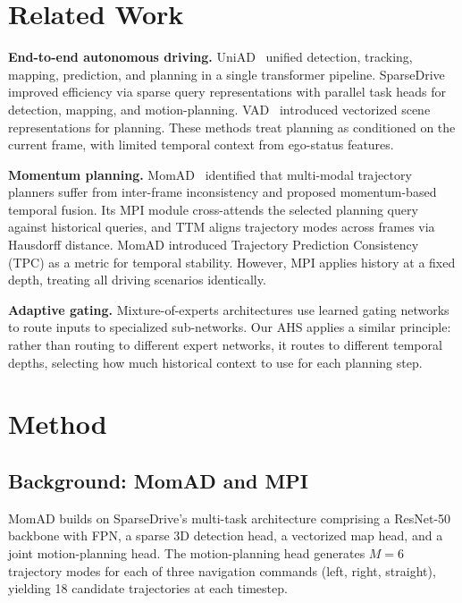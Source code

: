 \documentclass{article}
\begin{document}
\section{Related Work}
\label{sec:related}

\textbf{End-to-end autonomous driving.}
UniAD~\cite{hu2023uniad} unified detection, tracking, mapping, prediction, and planning in a single transformer pipeline.
SparseDrive~\cite{sun2024sparsedrive} improved efficiency via sparse query representations with parallel task heads for detection, mapping, and motion-planning.
VAD~\cite{jiang2023vad} introduced vectorized scene representations for planning.
These methods treat planning as conditioned on the current frame, with limited temporal context from ego-status features.

\textbf{Momentum planning.}
MomAD~\cite{li2025momad} identified that multi-modal trajectory planners suffer from inter-frame inconsistency and proposed momentum-based temporal fusion.
Its MPI module cross-attends the selected planning query against historical queries, and TTM aligns trajectory modes across frames via Hausdorff distance.
MomAD introduced Trajectory Prediction Consistency (TPC) as a metric for temporal stability.
However, MPI applies history at a fixed depth, treating all driving scenarios identically.

\textbf{Adaptive gating.}
Mixture-of-experts architectures use learned gating networks to route inputs to specialized sub-networks.
Our AHS applies a similar principle: rather than routing to different expert networks, it routes to different temporal depths, selecting how much historical context to use for each planning step.

\section{Method}
\label{sec:method}

\subsection{Background: MomAD and MPI}
\label{sec:background}

MomAD builds on SparseDrive's multi-task architecture comprising a ResNet-50 backbone with FPN, a sparse 3D detection head, a vectorized map head, and a joint motion-planning head.
The motion-planning head generates $M{=}6$ trajectory modes for each of three navigation commands (left, right, straight), yielding 18 candidate trajectories at each timestep.
\end{document}
